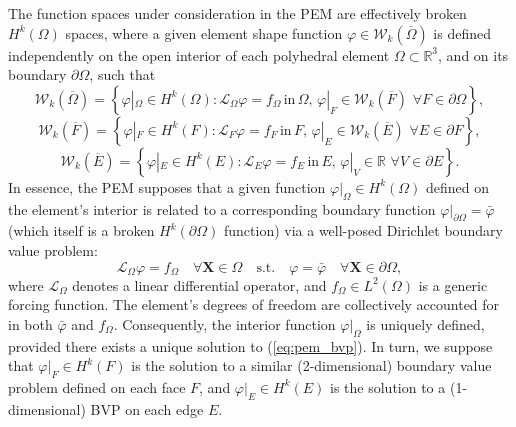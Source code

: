 	The function spaces under consideration in the PEM are effectively broken $H^k (\Omega)$ spaces, where a given element shape function $\varphi \in \mathcal{W}_k (\overline{\Omega})$ is defined independently on the open interior of each polyhedral element $\Omega \subset \mathbb{R}^3$, and on its boundary $\partial \Omega$, such that
	\begin{equation}
		\mathcal{W}_k (\overline{\Omega}) = \left\{ \varphi|_{\Omega} \in H^k (\Omega) : \mathcal{L}_{\Omega} \varphi = f_{\Omega} \, \text{in} \, \Omega, \, \varphi|_{F} \in \mathcal{W}_k (\overline{F}) \, \, \forall F \in \partial \Omega \right\},
	\end{equation}
	\begin{equation}
		\mathcal{W}_k (\overline{F}) = \left\{ \varphi|_{F} \in H^k (F) : \mathcal{L}_{F} \varphi = f_{F} \, \text{in} \, F, \, \varphi|_{E} \in \mathcal{W}_k (\overline{E}) \, \, \forall E \in \partial F \right\},
	\end{equation}
	\begin{equation}
		\mathcal{W}_k (\overline{E}) = \left\{ \varphi|_{E} \in H^k (E) : \mathcal{L}_{E} \varphi = f_{E} \, \text{in} \, E, \, \varphi|_{V} \in \mathbb{R} \, \, \forall V \in \partial E \right\}.
	\end{equation}
	In essence, the PEM supposes that a given function $\varphi|_{\Omega} \in H^k (\Omega)$ defined on the element's interior is related to a corresponding boundary function $\varphi|_{\partial \Omega} = \bar{\varphi}$ (which itself is a broken $H^k (\partial \Omega)$ function) via a well-posed Dirichlet boundary value problem:
	\begin{equation}
		\mathcal{L}_{\Omega} \varphi = f_{\Omega} \quad \forall \mathbf{X} \in \Omega \quad \text{s.t.} \quad \varphi = \bar{\varphi} \quad \forall \mathbf{X} \in \partial \Omega,
		\label{eq:pem_bvp}
	\end{equation}
	where $\mathcal{L}_{\Omega}$ denotes a linear differential operator, and $f_{\Omega} \in L^2 (\Omega)$ is a generic forcing function. The element's degrees of freedom are collectively accounted for in both $\bar{\varphi}$ and $f_{\Omega}$. Consequently, the interior function $\varphi|_{\Omega}$ is uniquely defined, provided there exists a unique solution to (\ref{eq:pem_bvp}). In turn, we suppose that $\varphi|_{F} \in H^k(F)$ is the solution to a similar (2-dimensional) boundary value problem defined on each face $F$, and $\varphi|_E \in H^k(E)$ is the solution to a (1-dimensional) BVP on each edge $E$.
	

